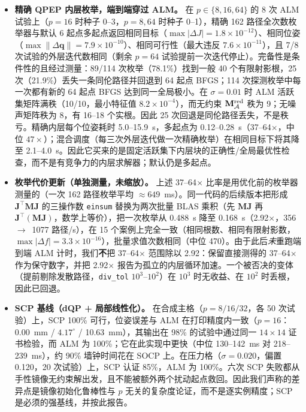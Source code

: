 \begin{itemize}
\item \textbf{精确 QPEP 内层枚举，端到端穿过 ALM。} 在 $p\in\{8,16,64\}$ 的 8 次 ALM 试验上（$p=16$ 时种子 0--3，$p=8,64$ 时种子 0--1），精确 162 路径全次数枚举器与默认 6 起点多起点返回相同目标（$\max|\Delta J|=1.8\times10^{-12}$）、相同位姿（$\max\|\Delta\mathbf q\|=7.9\times10^{-10}$）、相同可行性（最大违反 $7.6\times10^{-11}$），且 7/8 次试验的外层迭代数相同（剩余 $p=64$ 试验提前一次迭代停止）。完备性是条件性的且经过测量：89/114 次枚举（78.1\%）找到一般 40 个有限射影根，25 次（21.9\%）丢失一条同伦路径并回退到 64 起点 BFGS；114 次探测枚举中每一次都有新的 64 起点 BFGS 达到同一全局极小。在 $\sigma=0.01$ 时 ALM 活跃集矩阵满秩（10/10，最小特征值 $8.2\times10^{-4}$），而无约束 $\mathbf M^{\rm red}_{\mathcal A}$ 秩为 9；无噪声矩阵秩为 8，有 16--18 个实根。因此 25 次回退是同伦路径丢失，不是秩亏。精确内层每个位姿耗时 5.0--15.9~s，多起点为 0.12--0.28~s（37--64$\times$，中位 $47\times$）；混合调度（每三次外层迭代做一次精确枚举）在相同目标下将其降至 2.1--4.0~s。因此它买来的是固定活跃集下内层块的正确性/全局最优性检查，而不是有竞争力的内层求解器；默认仍是多起点。
\item \textbf{枚举代价更新（单独测量，未缩放）。} 上述 37--64$\times$ 比率是用优化前的枚举器测量的（一次 162 路径枚举平均 $\approx649$~ms）。同一代码的后续版本把形成 $\mathbf J^\top\mathbf M\mathbf J$ 的三操作数 \texttt{einsum} 替换为两次批量 BLAS 乘积（先 $\mathbf M\mathbf J$ 再 $\mathbf J^\top(\mathbf M\mathbf J)$，数学上等价），把一次枚举从 0.488~s 降至 0.168~s（2.92$\times$，356~$\to$~1077 路径/s），在 15 个案例上完全一致（相同根数、相同有限射影数，$\max|\Delta f|=3.3\times10^{-16}$），批量求值次数相同（中位 470）。由于此后\emph{未}重跑端到端 ALM 计时，我们\textbf{不}把 37--64$\times$ 范围除以 2.92：保留直接测得的 37--64$\times$ 作为保守数字，并把 2.92$\times$ 报告为孤立的内层循环加速。一个被否决的变体（提前剔除发散路径，\texttt{div\_tol} $10^3$--$10^2$）在 $10^3$ 时无收益、在 $10^2$ 时丢根，因此已回退。
\item \textbf{SCP 基线（dQP + 局部线性化）。} 在合成主格（$p=8/16/32$，各 50 次试验）上，SCP 100\% 可行，位姿误差与 ALM 在打印精度内一致（$p=16$：0.00~mm / $4.17^\circ$ / 10.63~mm），其输出在 98\% 的试验中通过同一 $14\times14$ 证书检验，而 ALM 为 100\%；它在此实现中更快（中位 130--142~ms 对 218--239~ms），约 90\% 墙钟时间花在 SOCP 上。在压力格（$\sigma=0.020$，偏置 0.120，20 次试验）上，SCP 认证 85\%，ALM 为 100\%。六次 SCP 失败都从手性镜像无约束解出发，且不能被额外两个扰动起点救回。因此我们声称的差异点是镜像初始化鲁棒性与 $p$ 无关的复杂度论证，而不是逐实例精度；SCP 是必须的强基线，并按此报告。

\end{itemize}
